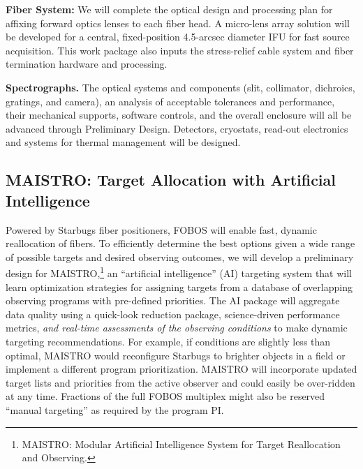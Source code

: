 \noindent \textbf{Fiber System:} We will complete the optical design and
processing plan for affixing forward optics lenses to each fiber head.  A
micro-lens array solution will be developed for a central,
fixed-position 4.5-arcsec diameter IFU for fast source acquisition. This
work package also inputs the stress-relief cable system and fiber
termination hardware and processing.

\noindent \textbf{Spectrographs.} The optical systems and components
(slit, collimator, dichroics, gratings, and camera), an analysis of
acceptable tolerances and performance, their mechanical supports,
software controls, and the overall enclosure will all be advanced
through Preliminary Design.  Detectors, cryostats, read-out electronics
and systems for thermal management will be designed.



\subsection{MAISTRO: Target Allocation with Artificial Intelligence}
\label{sec:targeting}

 Powered by Starbugs fiber positioners, FOBOS
will enable fast, dynamic reallocation of fibers. To efficiently
determine the best options given a wide range of possible targets and
desired observing outcomes, we will develop a preliminary design for
MAISTRO,\footnote{MAISTRO: Modular Artificial Intelligence System for
Target Reallocation and Observing.} an ``artificial intelligence''
(AI) targeting system that will learn optimization strategies for
assigning targets from a database of overlapping observing programs
with pre-defined priorities. The AI package will aggregate data
quality using a quick-look reduction package, science-driven
performance metrics, {\it and real-time assessments of the observing
conditions} to make dynamic targeting recommendations. For example,
if conditions are slightly less than optimal, MAISTRO would
reconfigure Starbugs to brighter objects in a field or implement a
different program prioritization. MAISTRO will incorporate updated
target lists and priorities from the active observer and could easily
be over-ridden at any time. Fractions of the full FOBOS multiplex
might also be reserved ``manual targeting'' as required by the
program PI.

